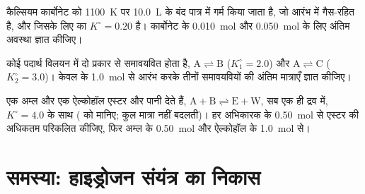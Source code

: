 \begin{exercise}[$\star\star\star$]\label{exo:b1:extent-q-and-k:10}
कैल्सियम कार्बोनेट को \qty{1100}{K} पर
\qty{10.0}{L} के बंद पात्र में गर्म किया जाता है, जो आरंभ में गैस-रहित है, और जिसके लिए
 का $K^\circ = 0.20$ है। कार्बोनेट के
\qty{0.010}{mol} और \qty{0.050}{mol} के लिए अंतिम अवस्था ज्ञात कीजिए।
\end{exercise}

\begin{exercise}[$\star\star\star$]\label{exo:b1:extent-q-and-k:11}
कोई पदार्थ  विलयन में दो प्रकार से समावयवित होता है, $\mathrm{A \rightleftharpoons B}$
($K_1^\circ = 2.0$) और $\mathrm{A \rightleftharpoons C}$ ($K_2^\circ = 3.0$)। केवल
 के \qty{1.0}{mol} से आरंभ करके तीनों समावयवियों की अंतिम मात्राएँ
ज्ञात कीजिए।
\end{exercise}

\begin{exercise}[$\star\star\star$]\label{exo:b1:extent-q-and-k:12}
एक अम्ल  और एक ऐल्कोहॉल  एस्टर और पानी देते हैं, $\mathrm{A + B
\rightleftharpoons E + W}$, सब एक ही द्रव  में, $K^\circ = 4.0$ के साथ (
को  मानिए; कुल मात्रा नहीं बदलती)।
हर अभिकारक के \qty{0.50}{mol} से एस्टर की अधिकतम  परिकलित कीजिए,
फिर अम्ल के \qty{0.50}{mol} और ऐल्कोहॉल के \qty{1.0}{mol} से।
\end{exercise}

\section{समस्या: हाइड्रोजन संयंत्र का निकास}

